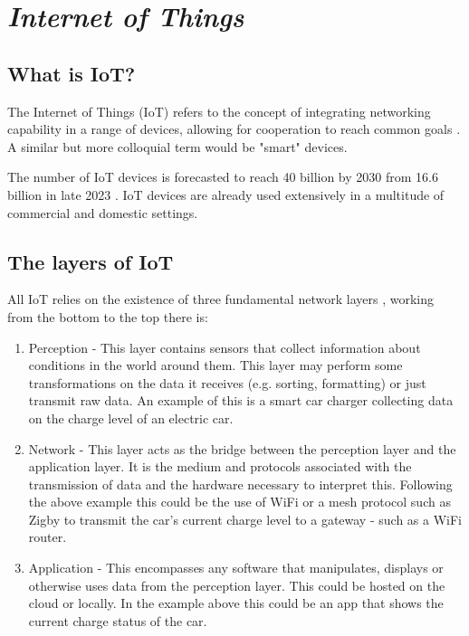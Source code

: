 \section{\emph{Internet of Things}}

\subsection{What is IoT?}

The Internet of Things (IoT) refers to the concept of integrating networking
capability in a range of devices, allowing for cooperation to reach common goals
\cite{atzori2010}. A similar but more colloquial term would be "smart" devices.

The number of IoT devices is forecasted to reach 40 billion by 2030 from 16.6
billion in late 2023 \cite{sinha2024}. IoT devices are already used extensively
in a multitude of commercial and domestic settings.

\subsection{The layers of IoT}

All IoT relies on the existence of three fundamental network layers
\cite{burhan2018iot}, working from the bottom to the top there is:

\begin{enumerate}
  \item Perception - This layer contains sensors that collect information about
  conditions in the world around them. This layer may perform some
  transformations on the data it receives (e.g. sorting, formatting) or just
  transmit raw data. An example of this is a smart car charger collecting data
  on the charge level of an electric car.
  \item Network - This layer acts as the bridge between the perception layer and
  the application layer. It is the medium and protocols associated with the
  transmission of data and the hardware necessary to interpret this. Following
  the above example this could be the use of WiFi or a mesh protocol such as
  Zigby to transmit the car's current charge level to a gateway - such as a
  WiFi router.
  \item Application - This encompasses any software that manipulates, displays
  or otherwise uses data from the perception layer. This could be hosted on the
  cloud or locally. In the example above this could be an app that shows the
  current charge status of the car.
\end{enumerate}

